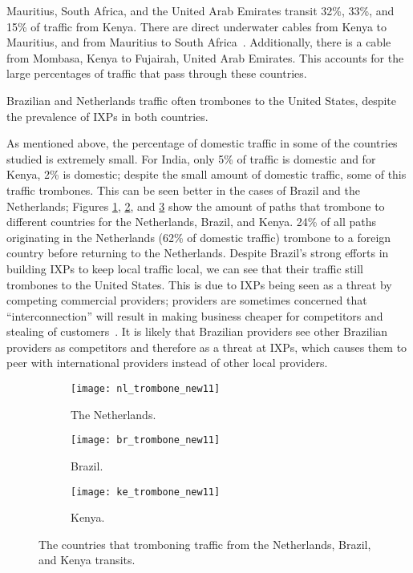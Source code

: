 Mauritius, South Africa, and the United Arab Emirates transit 32\%, 33\%, and 15\% of traffic from Kenya.  There are direct underwater cables from Kenya to Mauritius, and from Mauritius to South Africa~\cite{cablemap}.  Additionally, there is a cable from Mombasa, Kenya to Fujairah, United Arab Emirates.  This accounts for the large percentages of traffic that pass through these countries.

\begin{finding}
Brazilian and Netherlands traffic often trombones to the United States, despite the prevalence of IXPs in both countries.
\end{finding}
As mentioned above, the percentage of domestic traffic in some of the countries studied is extremely small.  For India, only 5\% of traffic is domestic and for Kenya, 2\% is domestic; despite the small amount of domestic traffic, some of this traffic trombones.  This can be seen better in the cases of Brazil and the Netherlands; 
Figures \ref{fig:trombone_netherlands}, \ref{fig:trombone_brazil}, and \ref{fig:trombone_kenya} show the amount of paths that trombone to different countries for the Netherlands, Brazil, and Kenya. 24\% of all paths originating in the Netherlands (62\% of domestic traffic) trombone to a foreign country before returning to the Netherlands. Despite Brazil's strong efforts in building IXPs to keep local traffic local, we can see that their traffic still trombones to the United States.  This is due to IXPs being seen as a threat by competing commercial providers; providers are sometimes concerned that ``interconnection'' will result in making business cheaper for competitors and stealing of customers~\cite{ixp_policy}.  It is likely that Brazilian providers see other Brazilian providers as competitors and therefore as a threat at IXPs, which causes them to peer with international providers instead of other local providers.

\begin{figure*}[t!]
\begin{minipage}{\linewidth}
\begin{subfigure}[b]{.32\linewidth}
\texttt{[image: nl\_trombone\_new11]}
\caption{The Netherlands.\label{fig:trombone_netherlands}}
\end{subfigure}
\begin{subfigure}[b]{.32\linewidth}
\texttt{[image: br\_trombone\_new11]}
\caption{Brazil.\label{fig:trombone_brazil}}
\end{subfigure}
\begin{subfigure}[b]{.32\linewidth}
\texttt{[image: ke\_trombone\_new11]}
\caption{Kenya.\label{fig:trombone_kenya}}
\end{subfigure}
\end{minipage}
\caption{The countries that tromboning traffic from the Netherlands, Brazil, and Kenya transits.}
\label{fig:trombone}
\end{figure*}

